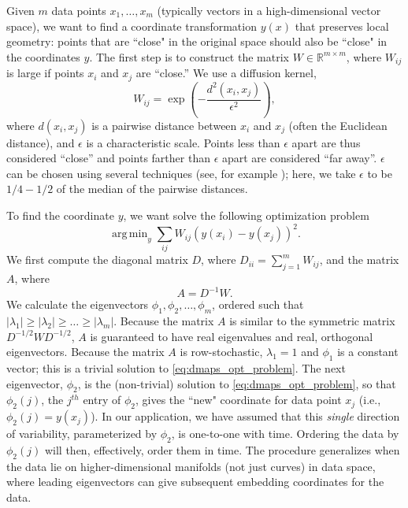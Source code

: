 \documentclass[10pt,twocolumn]{article}
\DeclareMathOperator*{\argmin}{arg\,min}
\begin{document}
Given $m$ data points $x_1, \dots, x_m$ (typically vectors in a high-dimensional vector space), we want to find a coordinate transformation $y(x)$ that preserves local geometry: points that are ``close" in the original space should also be ``close" in the coordinates $y$.
%
The first step is to construct the matrix $W \in \mathbb{R}^{m \times m}$, where $W_{ij}$ is large if points $x_i$ and $x_j$ are ``close.''
%
We use a diffusion kernel,
\begin{equation} \label{eq:dmaps_W}
W_{ij} = \exp \left( -\frac{d^2(x_i, x_j)}{\epsilon^2} \right),
\end{equation}
where $d(x_i, x_j)$ is a pairwise distance between $x_i$ and $x_j$ (often the Euclidean distance), and $\epsilon$ is a characteristic scale.
%
Points less than $\epsilon$ apart are thus considered ``close'' and points farther than $\epsilon$ apart are considered ``far away''.
%
$\epsilon$ can be chosen using several techniques (see, for example \citep{coifman2008graph, rohrdanz2011determination}); here, we take $\epsilon$ to be $1/4-1/2$ of the median of the pairwise distances.

To find the coordinate $y$, we want solve the following optimization problem \citep{Belkin2003}
\begin{equation} \label{eq:dmaps_opt_problem}
\argmin_{y} \sum_{ij} W_{ij} (y(x_i) - y(x_j))^2.
\end{equation}
%
We first compute the diagonal matrix $D$, where $D_{ii} = \sum_{j=1}^{m} W_{ij}$, and the matrix $A$, where
\begin{equation} \label{eq:dmaps_A}
A = D^{-1} W.
\end{equation}
%
We calculate the eigenvectors $\phi_1, \phi_2, \dots, \phi_m$, ordered such that $|\lambda_1| \ge |\lambda_2| \ge \dots \ge |\lambda_m|$.
%
Because the matrix $A$ is similar to the symmetric matrix $D^{-1/2} W D^{-1/2}$, $A$ is guaranteed to have real eigenvalues and real, orthogonal eigenvectors.
%
Because the matrix $A$ is row-stochastic, $\lambda_1=1$ and $\phi_1$ is a constant vector; this is a trivial solution to \eqref{eq:dmaps_opt_problem}.
%
%
The next eigenvector, $\phi_2$, is the (non-trivial) solution to \eqref{eq:dmaps_opt_problem}, so that $\phi_2(j)$, the $j^{th}$ entry of $\phi_2$, gives the ``new" coordinate for data point $x_j$ (i.e., $\phi_2(j) = y(x_j)$).
%
In our application, we have assumed that this {\em single} direction of variability, parameterized by $\phi_2$, is one-to-one with time.
%
Ordering the data by $\phi_2(j)$ will then, effectively, order them in time.
%
The procedure generalizes when the data lie on higher-dimensional manifolds (not just curves) in data space, where leading eigenvectors can give subsequent embedding coordinates for the data.
%
\end{document}
